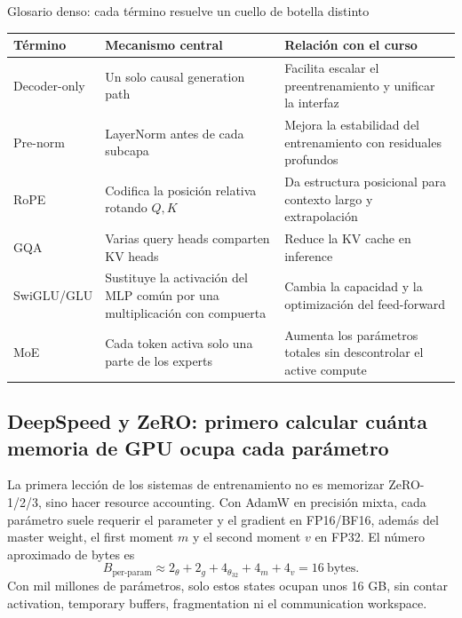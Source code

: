 \documentclass[a4paper]{article}
\begin{document}
\begin{knowledgebox}{Glosario denso: cada término resuelve un cuello de botella distinto}
\begin{tabularx}{\textwidth}{L{0.17\textwidth} L{0.30\textwidth} X}
\toprule
Término & Mecanismo central & Relación con el curso \\
\midrule
Decoder-only & Un solo causal generation path & Facilita escalar el preentrenamiento y unificar la interfaz \\
Pre-norm & LayerNorm antes de cada subcapa & Mejora la estabilidad del entrenamiento con residuales profundos \\
RoPE & Codifica la posición relativa rotando $Q,K$ & Da estructura posicional para contexto largo y extrapolación \\
GQA & Varias query heads comparten KV heads & Reduce la KV cache en inference \\
SwiGLU/GLU & Sustituye la activación del MLP común por una multiplicación con compuerta & Cambia la capacidad y la optimización del feed-forward \\
MoE & Cada token activa solo una parte de los experts & Aumenta los parámetros totales sin descontrolar el active compute \\
\bottomrule
\end{tabularx}
\end{knowledgebox}


\subsection{DeepSpeed y ZeRO: primero calcular cuánta memoria de GPU ocupa cada parámetro}

La primera lección de los sistemas de entrenamiento no es memorizar ZeRO-1/2/3, sino hacer resource accounting. Con AdamW en precisión mixta, cada parámetro suele requerir el parameter y el gradient en FP16/BF16, además del master weight, el first moment $m$ y el second moment $v$ en FP32. El número aproximado de bytes es
\[
B_{\text{per-param}}\approx 2_{\theta}+2_g+4_{\theta_{32}}+4_m+4_v=16\ \text{bytes}.
\]
Con mil millones de parámetros, solo estos states ocupan unos 16 GB, sin contar activation, temporary buffers, fragmentation ni el communication workspace.
\end{document}
